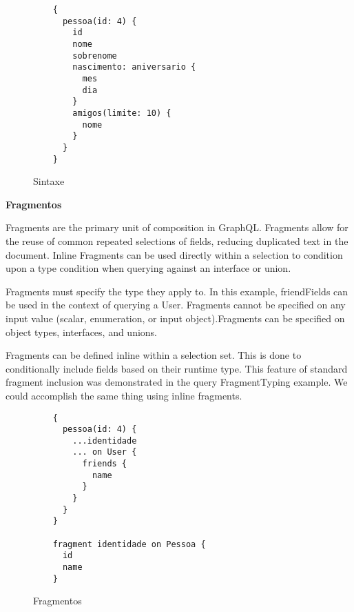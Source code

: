 \begin{figure}[H]
  \centering
  \begin{verbatim}
    {
      pessoa(id: 4) {
        id
        nome
        sobrenome
        nascimento: aniversario {
          mes
          dia
        }
        amigos(limite: 10) {
          nome
        }
      }
    }
  \end{verbatim}
  \caption{Sintaxe}
\end{figure}

\textbf{Fragmentos}

Fragments are the primary unit of composition in GraphQL. Fragments allow for the reuse of common repeated selections of fields, reducing duplicated text in the document. Inline Fragments can be used directly within a selection to condition upon a type condition when querying against an interface or union.

Fragments must specify the type they apply to. In this example, friendFields can be used in the context of querying a User. Fragments cannot be specified on any input value (scalar, enumeration, or input object).Fragments can be specified on object types, interfaces, and unions.

Fragments can be defined inline within a selection set. This is done to conditionally include fields based on their runtime type. This feature of standard fragment inclusion was demonstrated in the query FragmentTyping example. We could accomplish the same thing using inline fragments.

\begin{figure}[H]
  \centering
  \begin{verbatim}
    {
      pessoa(id: 4) {
        ...identidade
        ... on User {
          friends {
            name
          }
        }
      }
    }

    fragment identidade on Pessoa {
      id
      name
    }
  \end{verbatim}
  \caption{Fragmentos}
\end{figure}
